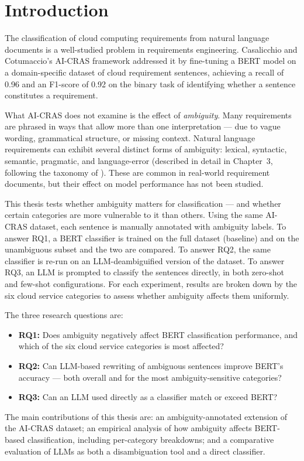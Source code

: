 \chapter{Introduction}
\thispagestyle{plain}

The classification of cloud computing requirements from natural language documents is a well-studied problem in requirements engineering. Casalicchio and Cotumaccio's AI-CRAS framework \cite{casalicchio2024aicras} addressed it by fine-tuning a BERT model on a domain-specific dataset of cloud requirement sentences, achieving a recall of 0.96 and an F1-score of 0.92 on the binary task of identifying whether a sentence constitutes a requirement.

What AI-CRAS does not examine is the effect of \textit{ambiguity}. Many requirements are phrased in ways that allow more than one interpretation — due to vague wording, grammatical structure, or missing context. Natural language requirements can exhibit several distinct forms of ambiguity: lexical, syntactic, semantic, pragmatic, and language-error (described in detail in Chapter~3, following the taxonomy of \cite{bano2015ambiguity}). These are common in real-world requirement documents, but their effect on model performance has not been studied.

This thesis tests whether ambiguity matters for classification — and whether certain categories are more vulnerable to it than others. Using the same AI-CRAS dataset, each sentence is manually annotated with ambiguity labels. To answer RQ1, a BERT classifier is trained on the full dataset (baseline) and on the unambiguous subset and the two are compared. To answer RQ2, the same classifier is re-run on an LLM-deambiguified version of the dataset. To answer RQ3, an LLM is prompted to classify the sentences directly, in both zero-shot and few-shot configurations. For each experiment, results are broken down by the six cloud service categories to assess whether ambiguity affects them uniformly.

The three research questions are:

\begin{itemize}
    \item \textbf{RQ1:} Does ambiguity negatively affect BERT classification performance, and which of the six cloud service categories is most affected?
    \item \textbf{RQ2:} Can LLM-based rewriting of ambiguous sentences improve BERT's accuracy — both overall and for the most ambiguity-sensitive categories?
    \item \textbf{RQ3:} Can an LLM used directly as a classifier match or exceed BERT?
\end{itemize}

The main contributions of this thesis are: an ambiguity-annotated extension of the AI-CRAS dataset; an empirical analysis of how ambiguity affects BERT-based classification, including per-category breakdowns; and a comparative evaluation of LLMs as both a disambiguation tool and a direct classifier.
